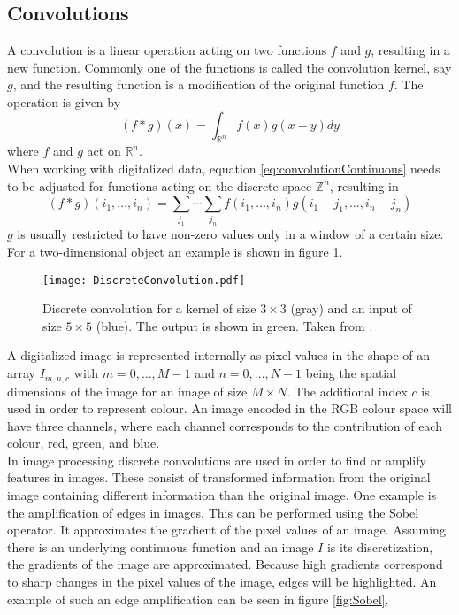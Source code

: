 \subsection{Convolutions}
A convolution is a linear operation acting on two functions $f$ and $g$, resulting in a new function. Commonly one of the functions is called the convolution kernel, say $g$, and the resulting function is a modification of the original function $f$. The operation is given by
\begin{equation} \label{eq:convolutionContinuous}
(f*g)(x) = \int_{\mathbb{R}^n} f(x)g(x-y)dy
\end{equation}
where $f$ and $g$ act on $\mathbb{R}^n$.  \\

When working with digitalized data, equation \ref{eq:convolutionContinuous} needs to be adjusted for functions acting on the discrete space $\mathbb{Z}^n$, resulting in
\begin{equation}\label{eq:convolutionDiscrete}
(f*g)(i_1,\dots ,i_n) = \sum_{j_1} \cdots \sum_{j_n} f(i_1,\dots ,i_n) g(i_1-j_1,\dots ,i_n-j_n)
\end{equation}
$g$ is usually restricted to have non-zero values only in a window of a certain size. For a two-dimensional object an example is shown in figure \ref{fig:Convolution}. \\

\begin{figure}[H]
\centering
\texttt{[image: DiscreteConvolution.pdf]}
\caption{Discrete convolution for a kernel of size $3\times 3$ (gray) and an input of size $5\times 5$ (blue). The output is shown in green. Taken from \cite{RajaKishor2016}.}
\label{fig:Convolution}
\end{figure}

A digitalized image is represented internally as pixel values in the shape of an array $I_{m,n,c}$ with $m=0,\dots ,M-1$ and $n=0,\dots ,N-1$ being the spatial dimensions of the image for an image of size $M\times N$. The additional index $c$ is used in order to represent colour. An image encoded in the RGB colour space will have three channels, where each channel corresponds to the contribution of each colour, red, green, and blue. \\

In image processing discrete convolutions are used in order to find or amplify features in images. These consist of transformed information from the original image containing different information than the original image. One example is the amplification of edges in images. This can be performed using the Sobel operator. It approximates the gradient of the pixel values of an image. Assuming there is an underlying continuous function and an image $I$ is its discretization, the gradients of the image are approximated. Because high gradients correspond to sharp changes in the pixel values of the image, edges will be highlighted. An example of such an edge amplification can be seen in figure \ref{fig:Sobel}.

